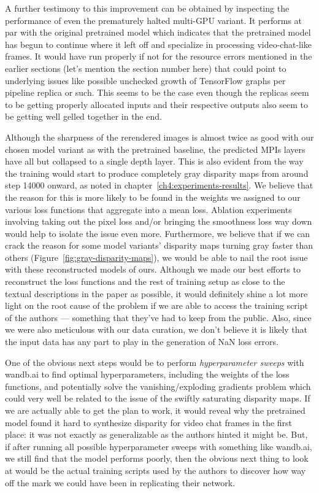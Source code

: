 A further testimony to this improvement can be obtained by inspecting the performance of even the prematurely halted multi-GPU variant. It performs at par with the original pretrained model which indicates that the pretrained model has begun to continue where it left off and specialize in processing video-chat-like frames. It would have run properly if not for the resource errors mentioned in the earlier sections (let's mention the section number here) that could point to underlying issues like possible unchecked growth of TensorFlow graphs per pipeline replica or such. This seems to be the case even though the replicas seem to be getting properly allocated inputs and their respective outputs also seem to be getting well gelled together in the end.

Although the sharpness of the rerendered images is almost twice as good with our chosen model variant as with the pretrained baseline, the predicted MPIs layers have all but collapsed to a single depth layer. This is also evident from the way the training would start to produce completely gray disparity maps from around step 14000 onward, as noted in chapter~\ref{ch4:experiments-results}. We believe that the reason for this is more likely to be found in the weights we assigned to our various loss functions that aggregate into a mean loss. Ablation experiments involving taking out the pixel loss and/or bringing the smoothness loss way down would help to isolate the issue even more. Furthermore, we believe that if we can crack the reason for some model variants' disparity maps turning gray faster than others (Figure~\ref{fig:gray-disparity-maps}), we would be able to nail the root issue with these reconstructed models of ours. Although we made our best efforts to reconstruct the loss functions and the rest of training setup as close to the textual descriptions in the paper as possible, it would definitely shine a lot more light on the root cause of the problem if we are able to access the training script of the authors --- something that they've had to keep from the public. Also, since we were also meticulous with our data curation, we don't believe it is likely that the input data has any part to play in the generation of NaN loss errors.

One of the obvious next steps would be to perform \textit{hyperparameter sweeps} with wandb.ai to find optimal hyperparameters, including the weights of the loss functions, and potentially solve the vanishing/exploding gradients problem which could very well be related to the issue of the swiftly saturating disparity maps. If we are actually able to get the plan to work, it would reveal why the pretrained model found it hard to synthesize disparity for video chat frames in the first place: it was not exactly as generalizable as the authors hinted it might be. But, if after running all possible hyperparameter sweeps with something like wandb.ai, we still find that the model performs poorly, then the obvious next thing to look at would be the actual training scripts used by the authors to discover how way off the mark we could have been in replicating their network.


